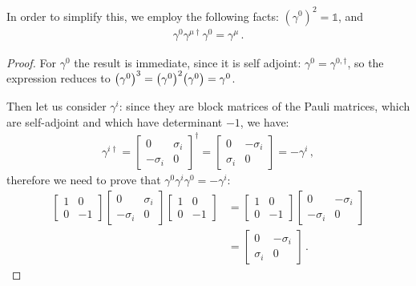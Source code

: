 \documentclass[main.tex]{subfiles}
\begin{document}
In order to simplify this, we employ the following facts: \((\gamma^{0})^2 = \mathbb{1}\), and 
%
\begin{align}
\gamma^{0} \gamma^{\mu \dag} \gamma^{0} = \gamma^{\mu }
\,.
\end{align}

\begin{proof}
For \(\gamma^{0}\) the result is immediate, since it is self adjoint: \(\gamma^{0} = \gamma^{0, \dag}\), so the expression reduces to \(\qty(\gamma^{0})^3 = \qty(\gamma^{0})^2 \qty(\gamma^{0}) = \gamma^{0}\).

Then let us consider \(\gamma^{i}\): since they are block matrices of the Pauli matrices, which are self-adjoint and which have determinant \(-1\), we have:
%
\begin{subequations}
\begin{align}
\gamma^{i \dag} = \left[\begin{array}{cc}
0 & \sigma_{i} \\ 
- \sigma_{i} & 0
\end{array}\right] ^\dag = 
\left[\begin{array}{cc}
0 & - \sigma_{i} \\ 
\sigma_{i} & 0
\end{array}\right] = - \gamma^{i}
\,,
\end{align}
\end{subequations}
%
therefore we need to prove that \(\gamma^{0} \gamma^{i} \gamma^{0} = -\gamma^{i}\): 
%
\begin{subequations}
\begin{align}
\left[\begin{array}{cc}
1 & 0 \\ 
0 & -1
\end{array}\right]
\left[\begin{array}{cc}
0 & \sigma_{i} \\ 
-\sigma_{i} & 0
\end{array}\right]
\left[\begin{array}{cc}
1 & 0 \\ 
0 & -1
\end{array}\right] &= 
\left[\begin{array}{cc}
1 & 0 \\ 
0 & -1
\end{array}\right]
\left[\begin{array}{cc}
0 & -\sigma_{i} \\ 
- \sigma_{i} & 0
\end{array}\right]  \\
&= 
\left[\begin{array}{cc}
0 & - \sigma_{i} \\ 
\sigma_{i} & 0
\end{array}\right]
\,.
\end{align}
\end{subequations}
\end{proof}
\end{document}
